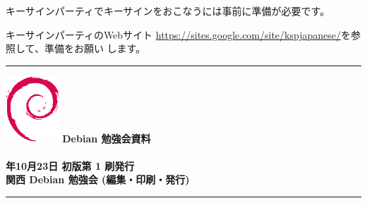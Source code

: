 \documentclass[mingoth,a4paper]{jsarticle}
\newcommand{\debmtgyear}{2011}
\newcommand{\debmtgmonth}{10}
\newcommand{\debmtgdate}{23}
\begin{document}
キーサインパーティでキーサインをおこなうには事前に準備が必要です。

キーサインパーティのWebサイト
\url{https://sites.google.com/site/kspjapanese/}を参照して、準備をお願い
します。


\mbox{}\newpage
\mbox{}\newpage

\printindex

 \begin{minipage}[b]{0.2\hsize}
 \end{minipage}
 \begin{minipage}[b]{0.8\hsize}

 \vspace*{15cm}
 \rule{\hsize}{1mm}
 \vspace{2mm}
 \includegraphics[width=2cm]{image200502/openlogo-nd.eps}
 \noindent \Large \bf Debian 勉強会資料\\ \\
 \noindent \normalfont \debmtgyear{}年\debmtgmonth{}月\debmtgdate{}日 \hspace{5mm}  初版第 1 刷発行\\
 \noindent \normalfont 関西 Debian 勉強会 (編集・印刷・発行)\\
 \rule{\hsize}{1mm}
 \end{minipage}
\end{document}
